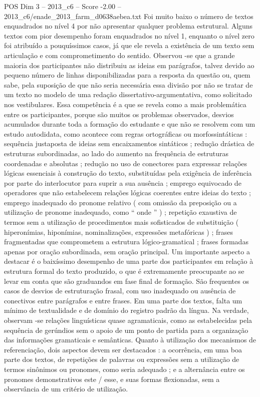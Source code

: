 \begin{textsample}{POS Dim 3 – 2013\_c6 – Score -2.00 – 2013\_c6/enade\_2013\_farm\_d0638aebea.txt}
Foi muito baixo o número de textos enquadrados no nível 4 por não apresentar qualquer problema estrutural.
Alguns textos com pior desempenho foram enquadrados no nível 1, enquanto o nível zero foi atribuído a pouquíssimos casos, já que ele revela a existência de um texto sem articulação e com comprometimento do sentido.
Observou -se que a grande maioria dos participantes não distribuiu as ideias em parágrafos, talvez devido ao pequeno número de linhas disponibilizadas para a resposta da questão ou, quem sabe, pela suposição de que não seria necessária essa divisão por não se tratar de um texto no modelo de uma redação dissertativo-argumentativa, como solicitado nos vestibulares.
Essa competência é a que se revela como a mais problemática entre os participantes, porque são muitos os problemas observados, desvios acumulados durante toda a formação do estudante e que não se resolvem com um estudo autodidata, como acontece com regras ortográficas ou morfossintáticas : sequência justaposta de ideias sem encaixamentos sintáticos ; redução drástica de estruturas subordinadas, ao lado do aumento na frequência de estruturas coordenadas e absolutas ; redução no uso de conectores para expressar relações lógicas essenciais à construção do texto, substituídas pela exigência de inferência por parte do interlocutor para suprir a sua ausência ; emprego equivocado de operadores que não estabelecem relações lógicas coerentes entre ideias do texto ; emprego inadequado do pronome relativo ( com omissão da preposição ou a utilização de pronome inadequado, como “ onde ” ) ; repetição exaustiva de termos sem a utilização de procedimentos mais sofisticados de substituição ( hiperonímias, hiponímias, nominalizações, expressões metafóricas ) ; frases fragmentadas que comprometem a estrutura lógico-gramatical ; frases formadas apenas por oração subordinada, sem oração principal.
Um importante aspecto a destacar é o baixíssimo desempenho de uma parte dos participantes em relação à estrutura formal do texto produzido, o que é extremamente preocupante ao se levar em conta que são graduandos em fase final de formação.
São frequentes os casos de desvios de estruturação frasal, com uso inadequado ou ausência de conectivos entre parágrafos e entre frases.
Em uma parte dos textos, falta um mínimo de textualidade e de domínio do registro padrão da língua.
Na verdade, observam -se relações linguísticas quase agramaticais, como as estabelecidas pela sequência de gerúndios sem o apoio de um ponto de partida para a organização das informações gramaticais e semânticas.
Quanto à utilização dos mecanismos de referenciação, dois aspectos devem ser destacados : a ocorrência, em uma boa parte dos textos, de repetições de palavras ou expressões sem a utilização de termos sinônimos ou pronomes, como seria adequado ; e a alternância entre os pronomes demonstrativos este / esse, e suas formas flexionadas, sem a observância de um critério de utilização.

\end{textsample}
